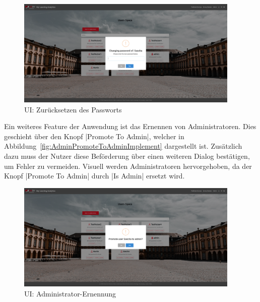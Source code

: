 \begin{figure}[!htb]
	\centering
	\includegraphics[width=0.95\textwidth, keepaspectratio]{img/client/AdmiSetPasswordOfUser.png}
	\captionsetup{justification=centering, format=plain}
	\caption[\acl{UI}: Zurücksetzen des Passworts]{\acl{UI}: Zurücksetzen des Passworts \\ \quelleScreenshot}
	\label{fig:AdminSetNewPasswordImplement}
\end{figure}

Ein weiteres Feature der Anwendung ist das Ernennen von Administratoren.
Dies geschieht über den Knopf \jinline|Promote To Admin|, welcher in Abbildung~\vref{fig:AdminPromoteToAdminImplement} dargestellt ist.
Zusätzlich dazu muss der Nutzer diese Beförderung über einen weiteren Dialog bestätigen, um Fehler zu vermeiden.
Visuell werden Administratoren hervorgehoben, da der Knopf \jinline|Promote To Admin| durch \jinline|Is Admin| ersetzt wird.

\begin{figure}[!htb]
	\centering
	\includegraphics[width=0.95\textwidth, keepaspectratio]{img/client/AdminPromoteToAdmin.png}
	\captionsetup{justification=centering, format=plain}
	\caption[\acl{UI}: Administrator-Ernennung]{\acl{UI}: Administrator-Ernennung \\ \quelleScreenshot}
	\label{fig:AdminPromoteToAdminImplement}
\end{figure}
